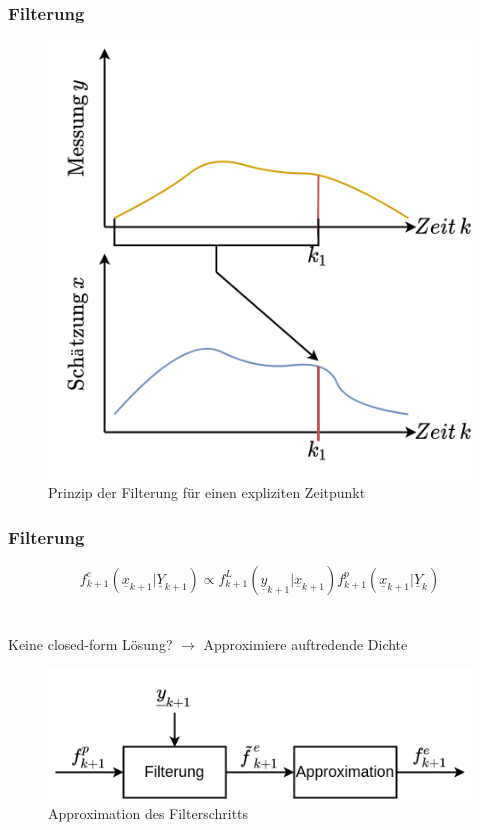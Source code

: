 \documentclass[18pt]{beamer}
\begin{document}
\begin{frame}
    \frametitle{Filterung}
    \begin{figure}
        \includegraphics[scale=0.19]{pictures/filtering.png}
        \caption{Prinzip der Filterung für einen expliziten Zeitpunkt}
    \end{figure}
\end{frame}

\begin{frame}
    \frametitle{Filterung}
    \begin{equation}
        f_{k+1}^{e}(\underline{x}_{k+1} \vert  \underline{Y}_{k+1}) 
        \propto  f^{L}_{k+1}(\underline{y}_{k+1} \vert \underline{x}_{k+1}) f^{p}_{k+1}(\underline{x}_{k+1} \vert \underline{Y}_{k})
    \end{equation}
    \\~\\
    \centering
    \large Keine closed-form Lösung? $\rightarrow$ Approximiere auftredende Dichte
    \begin{figure}
        \includegraphics[scale=0.25]{pictures/approximations_vorgehen.png}
        \caption{Approximation des Filterschritts}
    \end{figure}
\end{frame}
\end{document}
